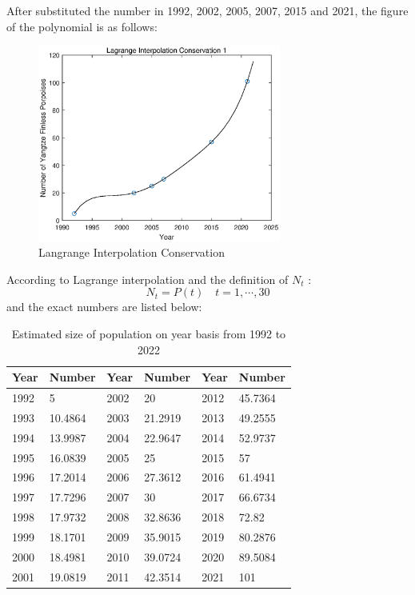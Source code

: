 \documentclass{mcmthesis}
\numberwithin{figure}{section}
\numberwithin{table}{section}
\numberwithin{equation}{section}
\begin{document}
After substituted the number in 1992, 2002, 2005, 2007, 2015 and 2021,
the figure of the polynomial is as follows:
\begin{figure}[htbp!]
  \centering
  \includegraphics[width = 8cm]{codes/Lagrange.eps}
  \caption{Langrange Interpolation Conservation}
\end{figure}

\par
According to Lagrange interpolation and the definition of $ N_t $ :
$$
  N_t = P(t) \quad t = 1,\cdots ,30
$$ 
and the exact numbers are listed below:
\begin{table}[htpb!]
  \centering
  \caption{Estimated size of population on year basis from 1992 to 2022} \label{Lagrange table}
  \begin{tabular}{m{2cm}<{\centering}|m{2cm}<{\centering}|m{2cm}<{\centering}|m{2cm}<{\centering}|m{2cm}<{\centering}|m{2cm}<{\centering}}
  \rowcolor{darkOrange}  \textbf{Year}&\textbf{Number}&\textbf{Year}&\textbf{Number}&\textbf{Year}&\textbf{Number}\\ \hline
  \rowcolor{Orange}  1992 & 5       & 2002 & 20      & 2012 & 45.7364 \\
  \rowcolor{lightOrange}  1993 & 10.4864 & 2003 & 21.2919 & 2013 & 49.2555 \\
  \rowcolor{Orange}  1994 & 13.9987 & 2004 & 22.9647 & 2014 & 52.9737 \\
  \rowcolor{lightOrange}  1995 & 16.0839 & 2005 & 25      & 2015 & 57      \\
  \rowcolor{Orange}  1996 & 17.2014 & 2006 & 27.3612 & 2016 & 61.4941 \\
  \rowcolor{lightOrange}  1997 & 17.7296 & 2007 & 30      & 2017 & 66.6734 \\
  \rowcolor{Orange}  1998 & 17.9732 & 2008 & 32.8636 & 2018 & 72.82   \\
  \rowcolor{lightOrange}  1999 & 18.1701 & 2009 & 35.9015 & 2019 & 80.2876 \\
  \rowcolor{Orange}  2000 & 18.4981 & 2010 & 39.0724 & 2020 & 89.5084 \\
  \rowcolor{lightOrange}  2001 & 19.0819 & 2011 & 42.3514 & 2021 & 101     \\
  \end{tabular}
\end{table}
\newpage
\end{document}
